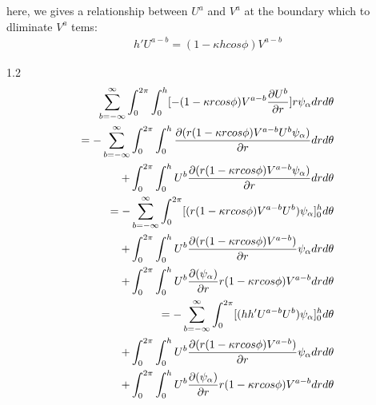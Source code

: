 \documentclass{Note}
\begin{document}
here, we gives a relationship between $U^a$ and $V^a$ at the boundary which to dliminate $V^a$ tems:
\begin{equation}
\begin{aligned}
{h'U^{a-b}}={(1-\kappa h cos \phi)}V^{a-b}
\end{aligned}
\end{equation}





1.2
\begin{equation}
\begin{aligned}
\sum_{b=-\infty}^{\infty}\int_0^{2\pi} \int_0^h  [-(1-\kappa rcos\phi)V^{a-b}{{\partial U^b}\over{\partial r}}] r  \psi_\alpha dr d\theta\\
=-\sum_{b=-\infty}^{\infty} \int_0^{2\pi} \int_0^h {\partial (r(1-\kappa rcos\phi)V^{a-b}U^b \psi_\alpha)\over\partial r } dr d\theta \\
+\int_0^{2\pi} \int_0^h U^b{ \partial (r(1-\kappa rcos\phi)V^{a-b}\psi_\alpha)\over\partial r} dr d\theta \\
=-\sum_{b=-\infty}^{\infty} \int_0^{2\pi} [ (r(1-\kappa rcos\phi)V^{a-b}U^b)\psi_\alpha ]_0^h  d\theta \\
+\int_0^{2\pi} \int_0^h U^b{ \partial (r(1-\kappa rcos\phi)V^{a-b})\over\partial r}\psi_\alpha dr d\theta \\
+\int_0^{2\pi} \int_0^h U^b{ \partial (\psi_\alpha)\over\partial r} r(1-\kappa rcos\phi)V^{a-b}dr d\theta \\
=-\sum_{b=-\infty}^{\infty} \int_0^{2\pi} [ (hh'U^{a-b}U^b)\psi_\alpha ]_0^h  d\theta \\
+\int_0^{2\pi} \int_0^h U^b{ \partial (r(1-\kappa rcos\phi)V^{a-b})\over\partial r}\psi_\alpha dr d\theta \\
+\int_0^{2\pi} \int_0^h U^b{ \partial (\psi_\alpha)\over\partial r} r(1-\kappa rcos\phi)V^{a-b}dr d\theta \\
\end{aligned}
\end{equation}
\end{document}
